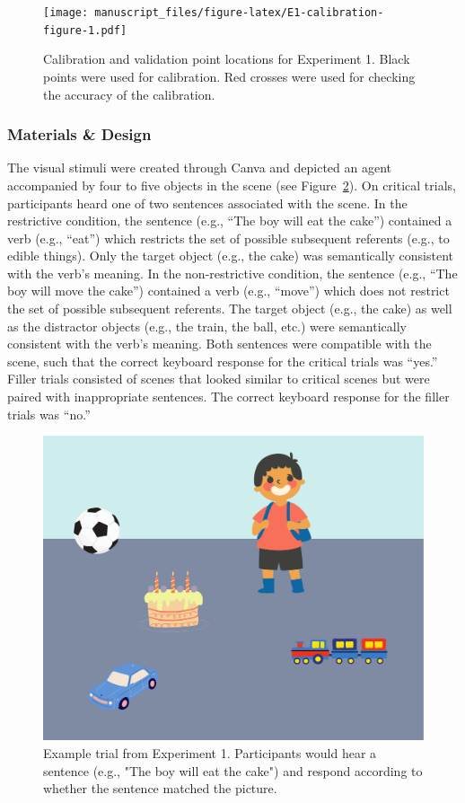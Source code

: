 \documentclass[
  man,floatsintext]{apa6}
\begin{document}
\begin{figure}
\centering
\texttt{[image: manuscript\_files/figure-latex/E1-calibration-figure-1.pdf]}
\caption{\label{fig:E1-calibration-figure}Calibration and validation point locations for Experiment 1. Black points were used for calibration. Red crosses were used for checking the accuracy of the calibration.}
\end{figure}

\hypertarget{materials-design}{%
\subsubsection{Materials \& Design}\label{materials-design}}

The visual stimuli were created through Canva and depicted an agent
accompanied by four to five objects in the scene (see Figure~\ref{fig:E1-example-trial}). On
critical trials, participants heard one of two sentences associated with
the scene. In the restrictive condition, the sentence (e.g., ``The boy
will eat the cake'') contained a verb (e.g., ``eat'') which restricts the
set of possible subsequent referents (e.g., to edible things). Only the
target object (e.g., the cake) was semantically consistent with the
verb's meaning. In the non-restrictive condition, the sentence (e.g.,
``The boy will move the cake'') contained a verb (e.g., ``move'') which does
not restrict the set of possible subsequent referents. The target object
(e.g., the cake) as well as the distractor objects (e.g., the train, the
ball, etc.) were semantically consistent with the verb's meaning. Both
sentences were compatible with the scene, such that the correct keyboard
response for the critical trials was ``yes.'' Filler trials consisted of
scenes that looked similar to critical scenes but were paired with
inappropriate sentences. The correct keyboard response for the filler
trials was ``no.''

\begin{figure}
\includegraphics[width=6.67in]{group-a/E1-example-trial} \caption{Example trial from Experiment 1. Participants would hear a sentence (e.g., "The boy will eat the cake") and respond according to whether the sentence matched the picture.}\label{fig:E1-example-trial}
\end{figure}
\end{document}
